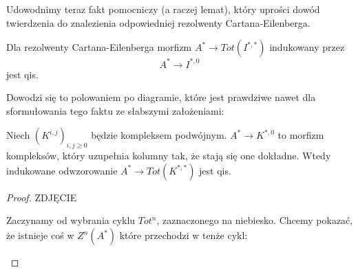   Udowodnimy teraz fakt pomocniczy (a raczej lemat), który uprości dowód twierdzenia do znalezienia odpowiedniej rezolwenty Cartana-Eilenberga.

  \begin{fact}\label{qis dla C-E}
  Dla rezolwenty Cartana-Eilenberga morfizm $A^*\to Tot(I^{*,*})$ indukowany przez 
  $$A^*\to I^{*,0}$$ 
  jest qis. 
\end{fact}

Dowodzi się to polowaniem po diagramie, które jest prawdziwe nawet dla sformułowania tego faktu ze słabszymi założeniami:
\begin{lemma}
  Niech $(K^{i,j})_{i,j\geq 0}$ będzie kompleksem podwójnym. $A^*\to K^{*,0}$ to morfizm kompleksów, który uzupełnia kolumny tak, że stają się one dokładne. Wtedy indukowane odwzorowanie $A^*\to Tot(K^{*,*})$ jest qis.
\end{lemma}

\begin{proof}
  {\large\color{red}ZDJĘCIE}

  Zaczynamy od wybrania cyklu $Tot^n$, zaznaczonego na niebiesko. Chcemy pokazać, że istnieje coś w $Z^n(A^*)$ które przechodzi w tenże cykl:
  \begin{center}\end{center}
\end{proof}




